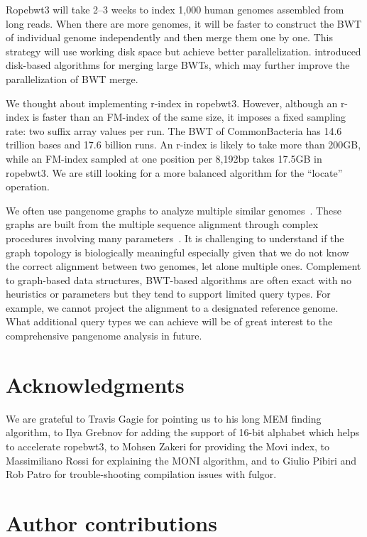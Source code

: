 \documentclass[webpdf,contemporary,large,namedate]{oup-authoring-template}%
\begin{document}
Ropebwt3 will take 2--3 weeks to index 1,000 human genomes assembled from long reads.
When there are more genomes, it will be faster to construct the BWT of individual genome independently
and then merge them one by one.
This strategy will use working disk space but achieve better parallelization.
\citet{DBLP:conf/dcc/Siren16} introduced disk-based algorithms for merging large BWTs, which may further improve the parallelization of BWT merge.

We thought about implementing r-index in ropebwt3.
However, although an r-index is faster than an FM-index of the same size,
it imposes a fixed sampling rate: two suffix array values per run.
The BWT of CommonBacteria has 14.6 trillion bases and 17.6 billion runs.
An r-index is likely to take more than 200GB,
while an FM-index sampled at one position per 8,192bp takes 17.5GB in ropebwt3.
We are still looking for a more balanced algorithm for the ``locate'' operation.

We often use pangenome graphs to analyze multiple similar genomes~\citep{Liao:2023aa}.
These graphs are built from the multiple sequence alignment through complex procedures involving many parameters~\citep{Li:2020aa,Hickey:2023aa,Garrison2023.04.05.535718}.
It is challenging to understand if the graph topology is biologically meaningful especially given that we do not know the correct alignment between two genomes, let alone multiple ones.
Complement to graph-based data structures, BWT-based algorithms are often exact with no heuristics or parameters but they tend to support limited query types.
For example, we cannot project the alignment to a designated reference genome.
What additional query types we can achieve will be of great interest to the comprehensive pangenome analysis in future.

\section*{Acknowledgments}

We are grateful to Travis Gagie for pointing us to his long MEM finding algorithm,
to Ilya Grebnov for adding the support of 16-bit alphabet which helps to accelerate ropebwt3,
to Mohsen Zakeri for providing the Movi index,
to Massimiliano Rossi for explaining the MONI algorithm,
and to Giulio Pibiri and Rob Patro for trouble-shooting compilation issues with fulgor.

\section*{Author contributions}
\end{document}
